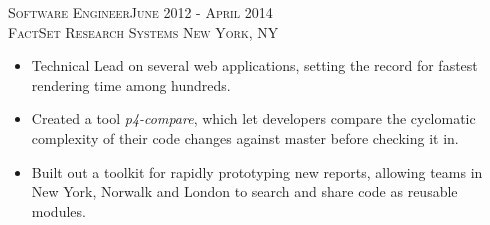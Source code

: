 \documentclass[oneside, final]{scrartcl}
\begin{document}
\begin{center}
\textsc{Software Engineer\hfill June 2012 - April 2014\\}
\textsc{FactSet Research Systems \hfill New York, NY\\}
\begin{itemize}
	\setlength{\itemsep}{1pt}
	\setlength{\parskip}{0pt}
	\setlength{\parsep}{0pt}
	\setlength{\leftmargin}{-5mm}
	\item Technical Lead on several web applications, setting the record for fastest rendering time among hundreds.
	\item Created a tool \textit{p4-compare}, which let developers compare the cyclomatic complexity of their code
	changes against master before checking it in.
	\item Built out a toolkit for rapidly prototyping new reports, allowing teams in New York, Norwalk and London to search and share code as reusable modules.
\end{itemize}

\begin{comment}

\textsc{Full Stack Game Developer\hfill June 2008 - April 2012\\}
\textsc{Freelance\hfill New York, NY\\}
\begin{itemize}
	\setlength{\itemsep}{1pt}
	\setlength{\parskip}{0pt}
	\setlength{\parsep}{0pt}
	\setlength{\leftmargin}{-5mm}
	\item Created a new interface to a text-based MMORPG, to enhance and improve fundamental gameplay.
    \item Provided real-time analytics comparing 800+ registered users - at peak popularity 50k writes per day.
    \item Wrote bots to simulate human interaction, automating every aspect of gameplay. Required header-
            spoofing, captcha cracking, and basic NLP. (Don’t tell the admins!)
\end{itemize}



\end{comment}
\end{center}
\end{document}
